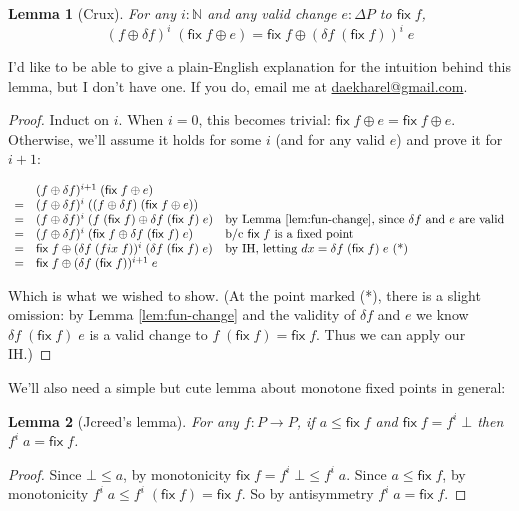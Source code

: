 \documentclass{article}
\newcommand{\ms}[1]{\ensuremath{\mathsf{#1}}}
\newcommand{\N}{\mathbb{N}}
\newtheorem{lemma}{Lemma}
\theoremstyle{definition}
\newcommand{\fix}{\ms{fix}}
\newcommand{\dv}{\delta}
\begin{document}
\begin{lemma}[Crux]
  For any $i : \N$ and any valid change $e : \Delta{P}$ to $\fix\;f$,
  \[
  (f\oplus\dv f)^i \;(\fix\;f \oplus e)
  = \fix\;f \oplus (\dv f \; (\fix\;f))^i \;e
  \]
  \label{lem:crux}
\end{lemma}

I'd like to be able to give a plain-English explanation for the intuition behind
this lemma, but I don't have one. If you do, email me at
\href{mailto:daekharel@gmail.com}{daekharel@gmail.com}.

\begin{proof}
  Induct on $i$. When $i = 0$, this becomes trivial: $\fix\;f\oplus e = \fix\;f
  \oplus e$. Otherwise, we'll assume it holds for some $i$ (and for any valid
  $e$) and prove it for $i+1$:

  \[\begin{array}{cll}
   & (f \oplus \dv f)^{i+1} \; (\fix\;f \oplus e)\\
  =& (f \oplus \dv f)^i \; ((f \oplus \dv f) \; (\fix\;f \oplus e))\\
  =& (f \oplus \dv f)^i \; (f\;(\fix\;f) \oplus \dv f \;(\fix\;f) \;e)
  & \text{by Lemma \ref{lem:fun-change}, since $\dv f$ and $e$ are valid}\\
  =& (f \oplus \dv f)^i \; (\fix\;f \oplus \dv f \;(\fix\;f) \;e)
  & \text{b/c $\fix\;f$ is a fixed point}\\
  =& \fix\;f \oplus (\dv f \;(fix\;f))^i \;(\dv f \;(\fix\;f) \;e)
  & \text{by IH, letting $dx = \dv f \;(\fix\;f) \;e$ (*)}\\
  =& \fix\;f \oplus (\dv f\;(\fix\;f))^{i+1}\;e
  \end{array}\]

  Which is what we wished to show. (At the point marked (*), there is a slight
  omission: by Lemma \ref{lem:fun-change} and the validity of $\dv f$ and $e$ we
  know $\dv f\; (\fix\;f) \;e$ is a valid change to $f\;(\fix\;f) = \fix\;f$.
  Thus we can apply our IH.)
\end{proof}

We'll also need a simple but cute lemma about monotone fixed points in general:

\begin{lemma}[Jcreed's lemma]
  For any $f : P \to P$, if $a \le \fix\;f$ and $\fix\;f = f^i\;\bot$ then
  $f^i\;a = \fix\;f$.
  \label{lem:jcreed}
\end{lemma}
\begin{proof}
  Since $\bot \le a$, by monotonicity $\fix\;f = f^i\;\bot \le f^i\;a$. Since $a
  \le \fix\;f$, by monotonicity $f^i\;a \le f^i\;(\fix\;f) = \fix\;f$. So by
  antisymmetry $f^i\;a = \fix\;f$.
\end{proof}
\end{document}
